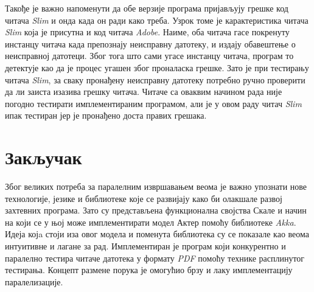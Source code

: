 \documentclass[12pt,oneside]{memoir}
\begin{document}
Такође је важно напоменути да обе верзије програма пријављују грешке код читача \textit{Slim} и онда када он ради како треба. Узрок томе је карактеристика читача \textit{Slim} која је присутна и код читача \textit{Adobe}. Наиме, оба читача гасе покренуту инстанцу читача када препознају неисправну датотеку, и издају обавештење о неисправној датотеци. Због тога што сами угасе инстанцу читача, програм то детектује као да је процес угашен због проналаска грешке. Зато је при тестирању читача \textit{Slim}, за сваку пронађену неисправну датотеку потребно ручно проверити да ли заиста изазива грешку читача. Читаче са оваквим начином рада није погодно тестирати имплементираним програмом, али је у овом раду читач \textit{Slim} ипак тестиран јер је пронађено доста правих грешака. 



%



\chapter{Закључак}
\label{chp:zakljucak}


Због великих потреба за паралелним извршавањем веома је важно упознати нове технологије, језике и библиотеке које се развијају како би олакшале развој захтевних програма. Зато су представљена функционална својства Скале и начин на који се у њој може имплементирати модел Актер помоћу библиотеке \textit{Akka}. Идеја којa стоји иза овог модела и поменута библиотека су се показале као веома интуитивне и лагане за рад. Имплементиран је програм који конкурентно и паралелно тестира читаче датотека у формату \textit{PDF} помоћу технике расплинутог тестирања. Концепт размене порука је омогућио брзу и лаку имплементацију паралелизације. 
\end{document}
